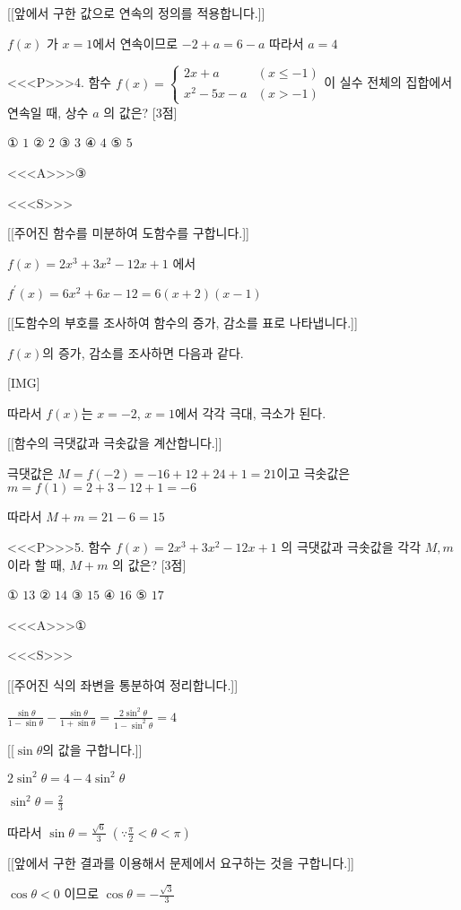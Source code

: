 \documentclass{oblivoir}
\begin{document}
[[앞에서 구한 값으로 연속의 정의를 적용합니다.]]

$f(x)$ 가 $x=1$에서 연속이므로 $-2+a=6-a$
따라서 $a=4$


<<<P>>>4. 함수 $f(x)= \begin{cases}2 x+a & (x \leq-1) \\ x^{2}-5 x-a & (x>-1)\end{cases}$이 실수 전체의 집합에서 연속일 때, 상수 $a$ 의 값은? [3점]

① $1$
② $2$
③ $3$
④ $4$
⑤ $5$


<<<A>>>③

<<<S>>>

[[주어진 함수를 미분하여 도함수를 구합니다.]]

$f(x)=2 x^{3}+3 x^{2}-12 x+1$ 에서

$f^{\prime}(x)=6 x^{2}+6 x-12=6(x+2)(x-1)$

[[도함수의 부호를 조사하여 함수의 증가, 감소를 표로 나타냅니다.]]

$f(x)$의 증가, 감소를 조사하면 다음과 같다.

[IMG]

따라서 $f(x)$는 $x=-2$, $x=1$에서 각각 극대, 극소가 된다.

[[함수의 극댓값과 극솟값을 계산합니다.]]

극댓값은 $M=f(-2)=-16+12+24+1=21$이고
극솟값은 $m=f(1)=2+3-12+1=-6$

따라서 $M+m=21-6=15$


<<<P>>>5. 함수 $f(x)=2 x^{3}+3 x^{2}-12 x+1$ 의 극댓값과 극솟값을 각각 $M, m$ 이라 할 때, $M+m$ 의 값은? [3점]

① $13$
② $14$
③ $15$
④ $16$
⑤ $17$

<<<A>>>①

<<<S>>>

[[주어진 식의 좌변을 통분하여 정리합니다.]]

$ \frac{\sin \theta}{1-\sin \theta}-\frac{\sin \theta}{1+\sin \theta}=\frac{2 \sin ^{2} \theta}{1-\sin ^{2} \theta}=4$

[[$\sin \theta$의 값을 구합니다.]]

$2 \sin ^{2} \theta=4-4 \sin ^{2} \theta$

$\sin ^{2} \theta=\frac{2}{3}$

따라서 $\sin \theta=\frac{\sqrt{6}}{3}\;\left(\because \frac{\pi}{2}<\theta<\pi\right)$

[[앞에서 구한 결과를 이용해서 문제에서 요구하는 것을 구합니다.]]

$\cos \theta<0$ 이므로 $\cos \theta=-\frac{\sqrt{3}}{3}$
\end{document}
